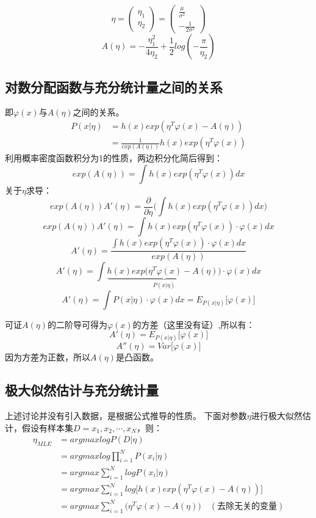 \documentclass[UTF8]{ctexart} %
\begin{document}
			\[\eta = \begin{pmatrix}
			\eta_1\\
			\eta_2
			\end{pmatrix}
			= 
			\begin{pmatrix}
				\frac{\mu}{\sigma^2}\\-\frac{1}{2\sigma^2}
			\end{pmatrix}\]
			\[A(\eta)=-\frac{\eta_1^2}{4\eta_2} + \frac{1}{2}log(-\frac{\pi}{\eta_2})\]
			
		\subsection{对数分配函数与充分统计量之间的关系}
			即$\varphi(x)$与$A(\eta)$之间的关系。
			\[\begin{aligned}
			P(x|\eta) &= h(x)exp(\eta^T\varphi(x)-A(\eta))\\
			&=\frac{1}{exp(A(\eta))}h(x)exp(\eta^T\varphi(x))
			\end{aligned}\]
			利用概率密度函数积分为1的性质，两边积分化简后得到：
			\[exp(A(\eta)) = \int h(x)exp(\eta^T\varphi(x))dx\]
			关于$\eta$求导：
			\[exp(A(\eta))A'(\eta) = \frac{\partial}{\partial\eta}\Big( \int h(x)exp(\eta^T\varphi(x))dx\Big)\]
			\[exp(A(\eta))A'(\eta) = \int h(x)exp(\eta^T\varphi(x))\cdot\varphi(x)dx\]
			\[A'(\eta) = \frac{\int h(x)exp(\eta^T\varphi(x))\cdot\varphi(x)dx}{exp(A(\eta))}\]
			\[A'(\eta) =\int \underbrace{h(x)exp\Big(\eta^T\varphi(x)-A(\eta)\Big)}_{P(x|\eta)}\cdot\varphi(x)dx\]
			\[A'(\eta) =\int P(x|\eta)\cdot\varphi(x)dx = E_{P(x|\eta)}\Big[\varphi(x)\Big]\]
			
			可证$A(\eta)$的二阶导可得为$\varphi(x)$的方差（这里没有证）,所以有：
			\[A'(\eta)=E_{P(x|\eta)}\Big[\varphi(x)\Big]\]
			\[A''(\eta)=Var\Big[\varphi(x)\Big]\]
			因为方差为正数，所以$A(\eta)$是凸函数。
		\subsection{极大似然估计与充分统计量}
			 上述讨论并没有引入数据，是根据公式推导的性质。
			 下面对参数$\eta$进行极大似然估计，假设有样本集$D={x_1,x_2,\cdots, x_N}$，则：
			 \[\begin{aligned}
			\eta_{MLE} &= argmaxlogP(D|\eta)\\
			&= argmaxlog\prod_{i=1}^NP(x_i|\eta)\\
			&= argmax\sum_{i=1}^NlogP(x_i|\eta)\\
			&= argmax\sum_{i=1}^Nlog\Big[h(x)exp(\eta^T\varphi(x)-A(\eta))\Big]\\
			&= argmax\sum_{i=1}^N\Big(\eta^T\varphi(x)-A(\eta)\Big)\quad(\text{去除无关的变量})
			 \end{aligned}\]
		
\end{document}
